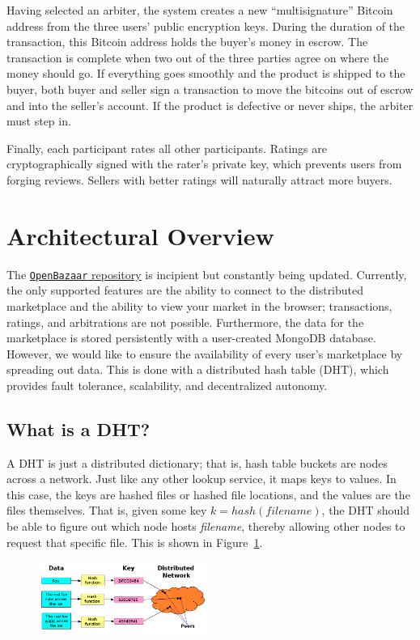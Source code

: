 \documentclass[12pt,twocolumn]{article}
\begin{document}
Having selected an arbiter, the system creates a new ``multisignature'' Bitcoin address from the three users' public encryption keys.
During the duration of the transaction, this Bitcoin address holds the buyer's money in escrow.
The transaction is complete when two out of the three parties agree on where the money should go.
If everything goes smoothly and the product is shipped to the buyer, both buyer and seller sign a transaction to move the bitcoins out of escrow and into the seller's account.
If the product is defective or never ships, the arbiter must step in.

Finally, each participant rates all other participants.
Ratings are cryptographically signed with the rater's private key, which prevents users from forging reviews.
Sellers with better ratings will naturally attract more buyers. 

\section{Architectural Overview}
The \href{https://github.com/OpenBazaar/OpenBazaar}{{\tt OpenBazaar} repository} is incipient but constantly being updated.
Currently, the only supported features are the ability to connect to the distributed marketplace and the ability to view your market in the browser; transactions, ratings, and arbitrations are not possible.
Furthermore, the data for the marketplace is stored persistently with a user-created MongoDB database.
However, we would like to ensure the availability of every user's marketplace by spreading out data.
This is done with a distributed hash table (DHT), which provides fault tolerance, scalability, and decentralized autonomy.

\subsection{What is a DHT?}
A DHT is just a distributed dictionary; that is, hash table buckets are nodes across a network.
Just like any other lookup service, it maps keys to values.
In this case, the keys are hashed files or hashed file locations, and the values are the files themselves.
That is, given some key $k = hash(filename)$, the DHT should be able to figure out which node hosts \emph{filename}, thereby allowing other nodes to request that specific file.
This is shown in Figure~\ref{DHT}.

\begin{figure}[h!]
  \centering
  \includegraphics[width=0.5\textwidth]{images/DHT.png}
  \caption{\label{DHT}}
\end{figure}
\end{document}
